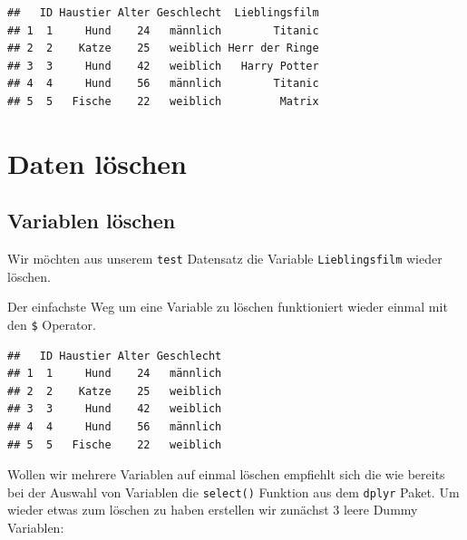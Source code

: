 \documentclass[
]{book}
\newenvironment{Shaded}{\begin{snugshade}}{\end{snugshade}}
\newcommand{\ConstantTok}[1]{\textcolor[rgb]{0.00,0.00,0.00}{#1}}
\newcommand{\NormalTok}[1]{#1}
\newcommand{\OtherTok}[1]{\textcolor[rgb]{0.56,0.35,0.01}{#1}}
\newcommand{\SpecialCharTok}[1]{\textcolor[rgb]{0.00,0.00,0.00}{#1}}
\begin{document}
\begin{verbatim}
##   ID Haustier Alter Geschlecht  Lieblingsfilm
## 1  1     Hund    24   männlich        Titanic
## 2  2    Katze    25   weiblich Herr der Ringe
## 3  3     Hund    42   weiblich   Harry Potter
## 4  4     Hund    56   männlich        Titanic
## 5  5   Fische    22   weiblich         Matrix
\end{verbatim}

\hypertarget{daten-luxf6schen}{%
\section{Daten löschen}\label{daten-luxf6schen}}

\hypertarget{variablen-luxf6schen}{%
\subsection{Variablen löschen}\label{variablen-luxf6schen}}

Wir möchten aus unserem \texttt{test} Datensatz die Variable \texttt{Lieblingsfilm} wieder löschen.

Der einfachste Weg um eine Variable zu löschen funktioniert wieder einmal mit den \texttt{\$} Operator.

\begin{Shaded}
\end{Shaded}

\begin{verbatim}
##   ID Haustier Alter Geschlecht
## 1  1     Hund    24   männlich
## 2  2    Katze    25   weiblich
## 3  3     Hund    42   weiblich
## 4  4     Hund    56   männlich
## 5  5   Fische    22   weiblich
\end{verbatim}

Wollen wir mehrere Variablen auf einmal löschen empfiehlt sich die wie bereits bei der Auswahl von Variablen die \texttt{select()} Funktion aus dem \texttt{dplyr} Paket. Um wieder etwas zum löschen zu haben erstellen wir zunächst 3 leere Dummy Variablen:

\begin{Shaded}
\end{Shaded}
\end{document}
